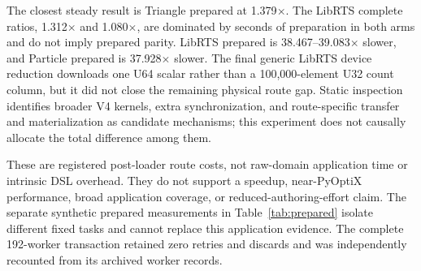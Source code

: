 The closest steady result is Triangle prepared at 1.379$\times$.  The LibRTS
complete ratios, 1.312$\times$ and 1.080$\times$, are dominated by seconds of
preparation in both arms and do not imply prepared parity.  LibRTS prepared is
38.467--39.083$\times$ slower, and Particle prepared is 37.928$\times$ slower.
The final generic LibRTS device reduction downloads one U64 scalar rather than
a 100,000-element U32 count column, but it did not close the remaining physical
route gap.  Static inspection identifies broader V4 kernels, extra
synchronization, and route-specific transfer and materialization as candidate
mechanisms; this experiment does not causally allocate the total difference
among them.

These are registered post-loader route costs, not raw-domain application time
or intrinsic DSL overhead.  They do not support a speedup, near-PyOptiX
performance, broad application coverage, or reduced-authoring-effort claim.
The separate synthetic prepared measurements
in Table~\ref{tab:prepared} isolate different fixed tasks and cannot replace
this application evidence.  The complete 192-worker transaction retained zero
retries and discards and was independently recounted from its archived worker
records.

